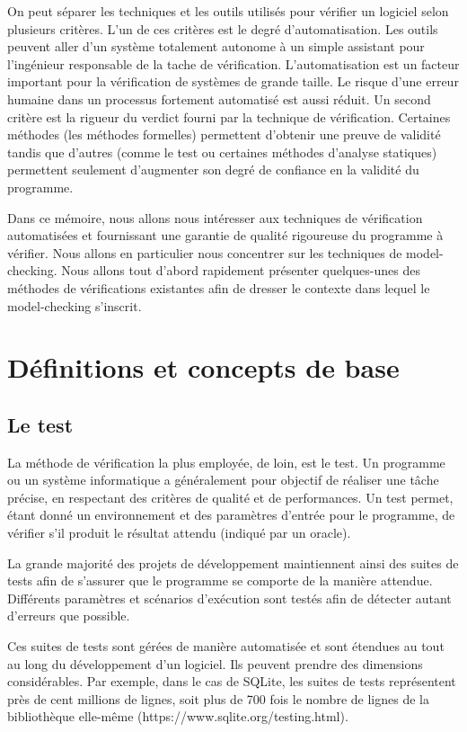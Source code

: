 On peut séparer les techniques et les outils utilisés pour vérifier un
logiciel selon plusieurs critères. L'un de ces critères est le degré
d'automatisation. Les outils peuvent aller d'un système totalement
autonome à un simple assistant pour l'ingénieur responsable de la tache de
vérification. L'automatisation est un facteur important pour la
vérification de systèmes de grande taille. Le risque d'une erreur
humaine dans un processus fortement automatisé est aussi réduit. Un
second critère est la rigueur du verdict fourni par la technique de
vérification. Certaines méthodes (les méthodes formelles) permettent
d'obtenir une preuve de validité tandis que d'autres (comme le test ou
certaines méthodes d'analyse statiques) permettent seulement d'augmenter
son degré de confiance en la validité du programme.

Dans ce mémoire, nous allons nous intéresser aux techniques de
vérification automatisées et fournissant une garantie de qualité
rigoureuse du programme à vérifier. Nous allons en particulier nous
concentrer sur les techniques de model-checking. Nous allons tout
d'abord rapidement présenter quelques-unes des méthodes de vérifications
existantes afin de dresser le contexte dans lequel le model-checking
s'inscrit.

\section{Définitions et concepts de base}  %

\subsection{Le test}

La méthode de vérification la plus employée, de loin, est le test. Un
programme ou un système informatique a généralement pour objectif de
réaliser une tâche précise, en respectant des critères de qualité et de
performances. Un test permet, étant donné un environnement et des
paramètres d'entrée pour le programme, de vérifier s’il produit le
résultat attendu (indiqué par un oracle).

La grande majorité des projets de développement maintiennent ainsi des
suites de tests afin de s'assurer que le programme se comporte de la
manière attendue. Différents paramètres et scénarios d'exécution sont
testés afin de détecter autant d'erreurs que possible.

Ces suites de tests sont gérées de manière automatisée et sont étendues au
tout au long du développement d'un logiciel. Ils peuvent prendre des
dimensions considérables. Par exemple, dans le cas de SQLite, les
suites de tests représentent près de cent millions de lignes, soit plus
de 700 fois le nombre de lignes de la bibliothèque elle-même
(https://www.sqlite.org/testing.html).

